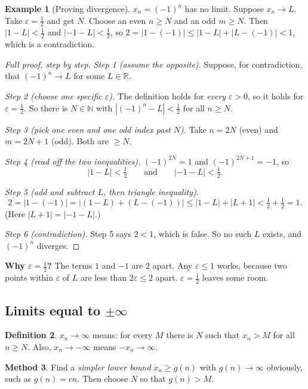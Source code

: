 \documentclass[11pt]{article}
\theoremstyle{definition}
\newtheorem{defn}{Definition}[section]
\newtheorem{ex}[defn]{Example}
\newtheorem{method}[defn]{Method}
\newcommand{\N}{\mathbb{N}}
\newcommand{\R}{\mathbb{R}}
\newcommand{\eps}{\varepsilon}
\newcommand{\key}[1]{\textcolor{red!70!black}{\textbf{#1}}}
\begin{document}
\begin{ex}[Proving divergence]
\label{ex:diverge}
$x_n=(-1)^n$ has no limit. Suppose $x_n\to L$. Take $\eps=\frac12$ and get
$N$. Choose an even $n\ge N$ and an odd $m\ge N$. Then
$|1-L|<\frac12$ and $|-1-L|<\frac12$, so
$2=|1-(-1)|\le|1-L|+|L-(-1)|<1$, which is a contradiction.

\begin{proof}[Full proof, step by step]
\emph{Step 1 (assume the opposite).} Suppose, for contradiction, that
$(-1)^n\to L$ for some $L\in\R$.

\emph{Step 2 (choose one specific $\eps$).} The definition holds for
\emph{every} $\eps>0$, so it holds for $\eps=\frac12$. So there is
$N\in\N$ with $|(-1)^n-L|<\frac12$ for all $n\ge N$.

\emph{Step 3 (pick one even and one odd index past $N$).} Take $n=2N$
(even) and $m=2N+1$ (odd). Both are $\ge N$.

\emph{Step 4 (read off the two inequalities).} $(-1)^{2N}=1$ and
$(-1)^{2N+1}=-1$, so
\[
|1-L|<\tfrac12\qquad\text{and}\qquad|-1-L|<\tfrac12.
\]

\emph{Step 5 (add and subtract $L$, then triangle inequality).}
\[
2=|1-(-1)|=|(1-L)+(L-(-1))|\le|1-L|+|L+1|<\tfrac12+\tfrac12=1.
\]
(Here $|L+1|=|-1-L|$.)

\emph{Step 6 (contradiction).} Step 5 says $2<1$, which is false. So no
such $L$ exists, and $(-1)^n$ diverges.
\end{proof}
\noindent\key{Why $\eps=\frac12$?} The terms $1$ and $-1$ are $2$ apart.
Any $\eps\le1$ works, because two points within $\eps$ of $L$ are less
than $2\eps\le2$ apart. $\eps=\frac12$ leaves some room.
\end{ex}

\subsection{Limits equal to $\pm\infty$}
\begin{defn}
$x_n\to\infty$ means: for every $M$ there is $N$ such that $x_n>M$ for all
$n\ge N$. Also, $x_n\to-\infty$ means $-x_n\to\infty$.
\end{defn}

\begin{method}
Find a \emph{simpler lower bound} $x_n\ge g(n)$ with $g(n)\to\infty$
obviously, such as $g(n)=cn$. Then choose $N$ so that $g(n)>M$.
\end{method}
\end{document}
